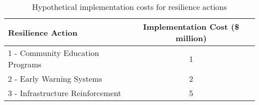 \begin{table}[H]
    \centering
    \caption{Hypothetical implementation costs for resilience actions}
    \label{table:implementation_costs}
    \begin{tabular}{lc}
        \hline
        \textbf{Resilience Action} & \textbf{Implementation Cost} (\$ million) \\
        \hline
        1 - Community Education Programs & 1 \\
        2 - Early Warning Systems & 2 \\
        3 - Infrastructure Reinforcement & 5 \\
        \hline
    \end{tabular}
\end{table}
